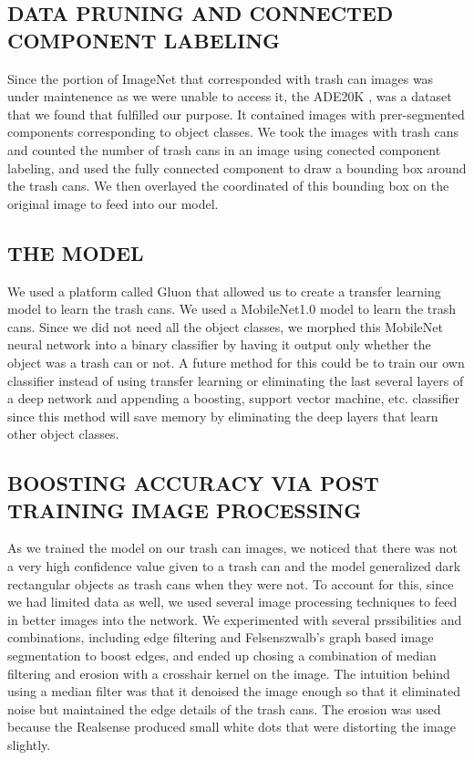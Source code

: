 \documentclass{article}
\begin{document}
\subsection{DATA PRUNING AND CONNECTED COMPONENT LABELING}
\label{ssec:dataprune}

Since the portion of ImageNet that corresponded with trash can images was under maintenence as we were unable to access it, the ADE20K \cite{zhou2017scene}, was a dataset that we found that fulfilled our purpose. It contained images with prer-segmented components corresponding to object classes. We took the images with trash cans and counted the number of trash cans in an image using conected component labeling, and used the fully connected component to draw a bounding box around the trash cans. We then overlayed the coordinated of this bounding box on the original image to feed into our model. 

\subsection{THE MODEL}
\label{ssec:themodel}

We used a platform called Gluon \cite{gluoncvnlp2019} that allowed us to create a transfer learning model to learn the trash cans. We used a MobileNet1.0 model to learn the trash cans. Since we did not need all the object classes, we morphed this MobileNet neural network into a binary classifier by having it output only whether the object was a trash can or not. A future method for this could be to train our own classifier instead of using transfer learning or eliminating the last several layers of a deep network and appending a boosting, support vector machine, etc. classifier since this method will save memory by eliminating the deep layers that learn other object classes. 

\subsection{BOOSTING ACCURACY VIA POST TRAINING IMAGE PROCESSING}
\label{ssec:boosting}

As we trained the model on our trash can images, we noticed that there was not a very high confidence value given to a trash can and the model generalized dark rectangular objects as trash cans when they were not. To account for this, since we had limited data as well, we used several image processing techniques to feed in better images into the network. We experimented with several prssibilities and combinations, including edge filtering and Felsenszwalb's graph based image segmentation to boost edges, and ended up chosing a combination of median filtering and erosion with a crosshair kernel on the image. The intuition behind using a median filter was that it denoised the image enough so that it eliminated noise but maintained the edge details of the trash cans. The erosion was used because the Realsense produced small white dots that were distorting the image slightly. 
\end{document}
